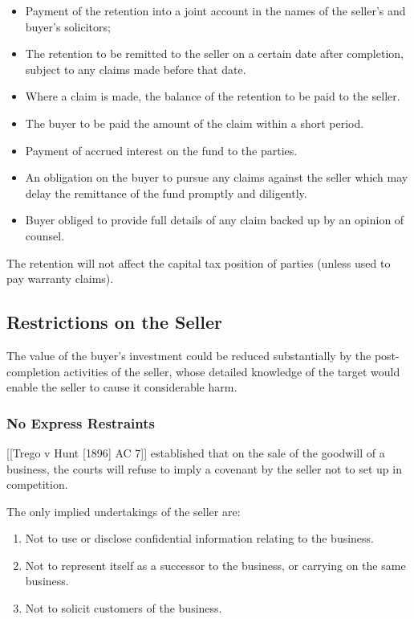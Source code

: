 \documentclass[
]{article}
\providecommand{\tightlist}{%
  \setlength{\itemsep}{0pt}\setlength{\parskip}{0pt}}
\begin{document}
\begin{itemize}
\tightlist
\item
  Payment of the retention into a joint account in the names of the
  seller's and buyer's solicitors;
\item
  The retention to be remitted to the seller on a certain date after
  completion, subject to any claims made before that date.
\item
  Where a claim is made, the balance of the retention to be paid to the
  seller.
\item
  The buyer to be paid the amount of the claim within a short period.
\item
  Payment of accrued interest on the fund to the parties.
\item
  An obligation on the buyer to pursue any claims against the seller
  which may delay the remittance of the fund promptly and diligently.
\item
  Buyer obliged to provide full details of any claim backed up by an
  opinion of counsel.
\end{itemize}

The retention will not affect the capital tax position of parties
(unless used to pay warranty claims).

\hypertarget{restrictions-on-the-seller}{%
\subsection{Restrictions on the
Seller}\label{restrictions-on-the-seller}}

The value of the buyer's investment could be reduced substantially by
the post-completion activities of the seller, whose detailed knowledge
of the target would enable the seller to cause it considerable harm.

\hypertarget{no-express-restraints}{%
\subsubsection{No Express Restraints}\label{no-express-restraints}}

{[}{[}Trego v Hunt {[}1896{]} AC 7{]}{]} established that on the sale of
the goodwill of a business, the courts will refuse to imply a covenant
by the seller not to set up in competition.

The only implied undertakings of the seller are:

\begin{enumerate}
\def\labelenumi{\arabic{enumi}.}
\tightlist
\item
  Not to use or disclose confidential information relating to the
  business.
\item
  Not to represent itself as a successor to the business, or carrying on
  the same business.
\item
  Not to solicit customers of the business.
\end{enumerate}
\end{document}
